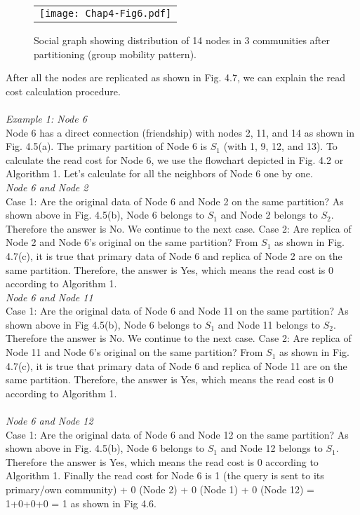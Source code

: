 \begin{figure}[h]
\begin{center}
  \begin{tabular}{c}
  \texttt{[image: Chap4-Fig6.pdf]}
  \end{tabular}
  \caption{Social graph showing distribution of 14 nodes in 3 communities after partitioning (group mobility pattern).}
\end{center}
\end{figure}

After all the nodes are replicated as shown in Fig. 4.7, we can explain the read cost calculation procedure. \\
\\
\emph{Example 1: Node 6}\\
Node 6 has a direct connection (friendship) with nodes 2, 11, and 14 as shown in Fig. 4.5(a). The primary partition of Node 6 is $S_1$ (with 1, 9, 12, and 13).
To calculate the read cost for Node 6, we use the flowchart depicted in Fig. 4.2 or Algorithm 1. Let's calculate for all the neighbors of Node 6 one by one.\\
{\it Node 6 and Node 2}\\
Case 1: Are the original data of Node 6 and Node 2 on the same partition? As shown above in Fig. 4.5(b), Node 6 belongs to $S_1$ and Node 2 belongs to $S_2$. Therefore the answer is No. We continue to the next case.
Case 2: Are replica of Node 2 and Node 6's original on the same partition? From $S_1$ as shown in Fig. 4.7(c), it is true that primary data of Node 6 and replica of Node 2 are on the same partition. Therefore, the answer is Yes, which means the read cost is 0 according to Algorithm 1.\\
{\it Node 6 and Node 11}\\
Case 1: Are the original data of Node 6 and Node 11 on the same partition? As shown above in Fig 4.5(b), Node 6 belongs to $S_1$ and Node 11 belongs to $S_2$. Therefore the answer is No. We continue to the next case.
Case 2: Are replica of Node 11 and Node 6's original on the same partition? From $S_1$ as shown in Fig. 4.7(c), it is true that primary data of Node 6 and replica of Node 11 are on the same partition. Therefore, the answer is Yes, which means the read cost is 0 according to Algorithm 1.\\ \\
{\it Node 6 and Node 12}\\
Case 1: Are the original data of Node 6 and Node 12 on the same partition? As shown above in Fig. 4.5(b), Node 6 belongs to $S_1$ and Node 12 belongs to $S_1$. Therefore the answer is Yes, which means the read cost is 0 according to Algorithm 1.
Finally the read cost for Node 6 is 1 (the query is sent to its primary/own community) + 0 (Node 2) + 0 (Node 1) + 0 (Node 12) = 1+0+0+0 = 1 as shown in Fig 4.6.

